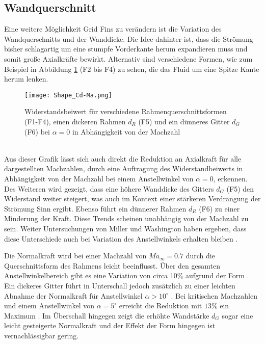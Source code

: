 \subsection{Wandquerschnitt}\label{sec_wandquerschnitt}
Eine weitere Möglichkeit Grid Fins zu verändern ist die Variation des Wandquerschnitts und der Wanddicke. Die Idee dahinter ist, dass die Strömung bisher schlagartig um eine stumpfe Vorderkante herum expandieren muss und somit große Axialkräfte bewirkt. Alternativ sind verschiedene Formen, wie zum Beispiel in Abbildung \ref{abb_Shape_Cd} (F2 bis F4) zu sehen, die das Fluid um eine Spitze Kante herum lenken.
\begin{figure}[h]
	\centering
	\texttt{[image: Shape\_Cd-Ma.png]}
	\begin{flushright}
	\end{flushright}
	\caption{Widerstandsbeiwert für verschiedene Rahmenquerschnittsformen (F1-F4), einen dickeren Rahmen $d_R$ (F5) und ein dünneres Gitter $d_G$ (F6) bei $\alpha = 0$ in Abhängigkeit von der Machzahl}
	\label{abb_Shape_Cd}
\end{figure}\\
Aus dieser Grafik lässt sich auch direkt die Reduktion an Axialkraft für alle dargestellten Machzahlen, durch eine Auftragung des Widerstandbeiwerts in Abhängigkeit von der Machzahl bei einem Anstellwinkel von $\alpha=0$, erkennen. Des Weiteren wird gezeigt, dass eine höhere Wanddicke des Gitters $d_G$ (F5) den Widerstand weiter steigert, was auch im Kontext einer stärkeren Verdrängung der Strömung Sinn ergibt. Ebenso führt ein dünnerer Rahmen $d_R$ (F6) zu einer Minderung der Kraft. Diese Trends scheinen unabhängig von der Machzahl zu sein. Weiter Untersuchungen von Miller und Washington haben ergeben, dass diese Unterschiede auch bei Variation des Anstellwinkels erhalten bleiben \cite{Shape}.

Die Normalkraft wird bei einer Machzahl von $Ma_\infty=0.7$ durch die Querschnittsform des Rahmens leicht beeinflusst. Über den gesamten Anstellwinkelbereich gibt es eine Variation von circa 10\% aufgrund der Form \cite{Pattern}. Ein dickeres Gitter führt in Unterschall jedoch zusätzlich zu einer leichten Abnahme der Normalkraft für Anstellwinkel $\alpha>10^\circ$ \cite{Pattern}. Bei kritischen Machzahlen und einem Anstellwinkel von $\alpha=5^\circ$ erreicht die Reduktion mit $13\%$ ein Maximum \cite{Pattern}. Im Überschall hingegen zeigt die erhöhte Wandstärke $d_G$ sogar eine leicht gesteigerte Normalkraft und der Effekt der Form hingegen ist vernachlässigbar gering.

